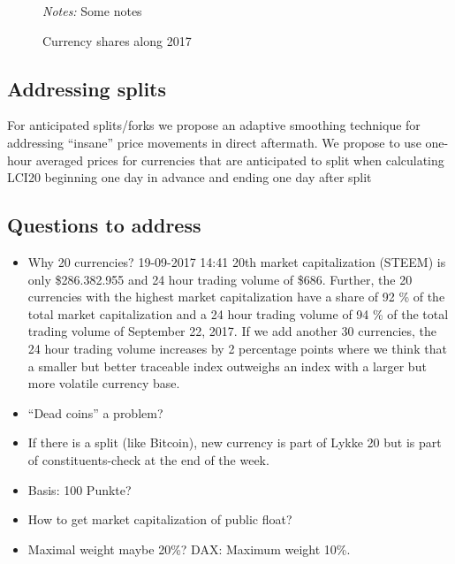 \documentclass[11pt]{article}
\newcommand\fnotes[1]{\captionsetup{font=scriptsize}\caption*{\textsl{Notes:} #1}}
\begin{document}
\begin{figure}%
    \centering%
    \caption{Currency shares along 2017}\label{f:curshares}%
    \fnotes{Some notes}
\end{figure}

\subsection{Addressing splits}\label{subseq:split_smoothing}
For anticipated splits/forks we propose an adaptive smoothing technique for addressing ``insane'' price movements in direct aftermath.
We propose to use one-hour averaged prices for currencies that are anticipated to split when calculating LCI20 beginning one day in advance and ending one day after split 


\subsection{Questions to address}
\begin{itemize}
  \item Why 20 currencies? 19-09-2017 14:41 20th market capitalization (STEEM) is only \$286.382.955 and 24 hour trading volume of \$686. Further, the 20 currencies with the highest market capitalization have a share of 92 \% of the total market capitalization and a 24 hour trading volume of 94 \% of the total trading volume of September 22, 2017. If we add another 30 currencies, the 24 hour trading volume increases by 2 percentage points where we think that a smaller but better traceable index outweighs an index with a larger but more volatile currency base.
  \item ``Dead coins'' a problem?
  \item If there is a split (like Bitcoin), new currency is part of Lykke 20 but is part of constituents-check at the end of the week.
  \item Basis: 100 Punkte?
  \item How to get market capitalization of public float?
  \item Maximal weight maybe 20\%? DAX: Maximum weight 10\%.
\end{itemize}
\end{document}
